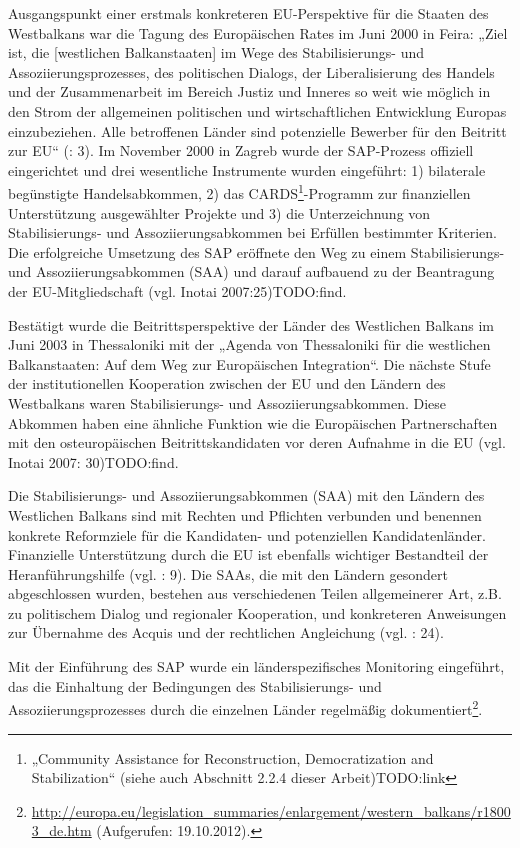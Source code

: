 Ausgangspunkt einer erstmals konkreteren EU-Perspektive für die Staaten des Westbalkans war die Tagung des Europäischen Rates im Juni 2000 in Feira: „Ziel ist, die [westlichen Balkanstaaten] im Wege des Stabilisierungs- und Assoziierungsprozesses, des politischen Dialogs, der Liberalisierung des Handels und der Zusammenarbeit im Bereich Justiz und Inneres so weit wie möglich in den Strom der allgemeinen politischen und wirtschaftlichen Entwicklung Europas einzubeziehen. Alle betroffenen Länder sind potenzielle Bewerber für den Beitritt zur EU“ (\cite{euko05}: 3). Im November 2000 in Zagreb wurde der SAP-Prozess offiziell eingerichtet und drei wesentliche Instrumente wurden eingeführt: 1) bilaterale begünstigte Handelsabkommen, 2) das CARDS\footnote{„Community Assistance for Reconstruction, Democratization and Stabilization“ (siehe auch Abschnitt 2.2.4 dieser Arbeit)TODO:link}-Programm zur finanziellen Unterstützung ausgewählter Projekte und 3) die Unterzeichnung von Stabilisierungs- und Assoziierungsabkommen bei Erfüllen bestimmter Kriterien. Die erfolgreiche Umsetzung des SAP eröffnete den Weg zu einem Stabilisierungs- und Assoziierungsabkommen (SAA) und darauf aufbauend zu der Beantragung der EU-Mitgliedschaft (vgl. Inotai 2007:25)TODO:find. \par
Bestätigt wurde die Beitrittsperspektive der Länder des Westlichen Balkans im Juni 2003 in Thessaloniki mit der „Agenda von Thessaloniki für die westlichen Balkanstaaten: Auf dem Weg zur Europäischen Integration“. Die nächste Stufe der institutionellen Kooperation zwischen der EU und den Ländern des Westbalkans waren Stabilisierungs- und Assoziierungsabkommen. Diese Abkommen haben eine ähnliche Funktion wie die Europäischen Partnerschaften mit den osteuropäischen Beitrittskandidaten vor deren Aufnahme in die EU (vgl. Inotai 2007: 30)TODO:find.\par
Die Stabilisierungs- und Assoziierungsabkommen (SAA) mit den Ländern des Westlichen Balkans sind mit Rechten und Pflichten verbunden und benennen konkrete Reformziele für die Kandidaten- und potenziellen Kandidatenländer. Finanzielle Unterstützung durch die EU ist ebenfalls wichtiger Bestandteil der Heranführungshilfe (vgl. \cite{euko07}: 9). Die SAAs, die mit den Ländern gesondert abgeschlossen wurden, bestehen aus verschiedenen Teilen allgemeinerer Art, z.B. zu politischem Dialog und regionaler Kooperation, und konkreteren Anweisungen zur Übernahme des Acquis und der rechtlichen Angleichung (vgl. \cite{marwedel}: 24).\par
Mit der Einführung des SAP wurde ein länderspezifisches Monitoring eingeführt, das die Einhaltung der Bedingungen des Stabilisierungs- und Assoziierungsprozesses durch die einzelnen Länder regelmäßig dokumentiert\footnote{\url{http://europa.eu/legislation_summaries/enlargement/western_balkans/r18003_de.htm} (Aufgerufen: 19.10.2012).}.\par
